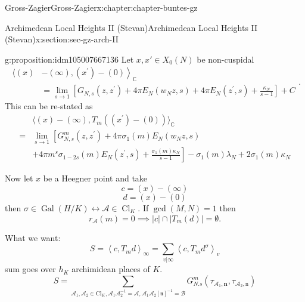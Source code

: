\documentclass[oneside,10pt,]{book}
\numberwithin{equation}{section}
\newcommand{\pair}[2]{\left\langle #1, #2 \right\rangle}
\DeclareMathOperator{\Cl}{Cl}
\newcommand{\Gal}[2]{\operatorname{Gal}(#1/#2)}
\newcommand{\amp}{&}
\begin{document}
\begin{chapterptx}{Gross-Zagier}{}{Gross-Zagier}{}{}{x:chapter:chapter-buntes-gz}
\begin{sectionptx}{Archimedean Local Heights II (Stevan)}{}{Archimedean Local Heights II (Stevan)}{}{}{x:section:sec-gz-arch-II}
\begin{proposition}{}{}{g:proposition:idm105007667136}
Let \(x,x'\in X_0(N)\) be non-cuspidal%
\begin{equation*}
\begin{aligned}\langle(x)\amp\left.-(\infty),\left(x^{\prime}\right)-(0)\right\rangle_{\mathbb{C}} \\ \amp=\lim _{s \rightarrow 1}\left[G_{N, s}\left(z, z^{\prime}\right)+4 \pi E_{N}\left(w_{N} z, s\right)+4 \pi E_{N}\left(z^{\prime}, s\right)+\frac{\kappa_{N}}{s-1}\right]+C \end{aligned}\text{.}
\end{equation*}
This can be re-stated as%
\begin{equation*}
\begin{aligned}\amp\langle(x)-(\infty), T_{m}\left(\left(x^{\prime}\right)-(0)\right)\rangle_{\mathbb{C}} \\=\amp \lim _{s \rightarrow 1}\left[G_{N, s}^{m}\left(z, z^{\prime}\right)+4 \pi \sigma_{1}(m) E_{N}\left(w_{N} z, s\right)\right.\\ \amp\left.+4 \pi m^{s} \sigma_{1-2 s}(m) E_{N}\left(z^{\prime}, s\right)+\frac{\sigma_{1}(m) \kappa_{N}}{s-1}\right]-\sigma_{1}(m) \lambda_{N}+2 \sigma_{1}(m) \kappa_{N} \end{aligned}
\end{equation*}
%
\end{proposition}
Now let \(x\) be a Heegner point and take%
\begin{equation*}
c= (x)  - (\infty )
\end{equation*}
%
\begin{equation*}
d = (x)-(0)
\end{equation*}
then \(\sigma \in \Gal HK \leftrightarrow \mathscr A\in \Cl_K\). If \(\gcd(M,N) = 1\) then%
\begin{equation*}
r_{\mathscr A} (m ) = 0 \implies |c| \cap |T_m (d)| = \emptyset\text{.}
\end{equation*}
%
\par
What we want:%
\begin{equation*}
S = \pair c {T_md}_\infty  = \sum_{v|\infty } \pair c {T_md^\sigma }_v
\end{equation*}
sum goes over \(h_K\) archimidean places of \(K\).%
\begin{equation*}
S = \sum_{\mathscr{A}_{1}, \mathscr{A}_{2} \in \mathrm{Cl}_{K} , \mathscr{A}_{1} \mathscr{A}_{2}^{-1}=\mathscr{A}, \mathscr{A}_{1} \mathscr{A}_{2}[\mathfrak{n}]^{-1}=\mathscr{B}} G_{N . s}^{m}\left(\tau_{\mathscr{A}_{1}, \mathbf{n}}, \tau_{\mathscr{A}_{2}, \mathrm{n}}\right)
\end{equation*}

\end{sectionptx}
\end{chapterptx}
\end{document}
